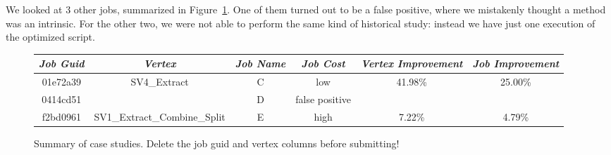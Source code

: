 We looked at 3 other jobs, summarized in Figure~\ref{fig:caseStudySummary}.
One of them turned out to be a false positive, where we mistakenly thought a method was an intrinsic.
For the other two, we were not able to perform the same kind of historical study: instead we have just one execution of the optimized script.
\begin{figure}[ht]
\begin{tabular}{c|c|c|c|c|c} 
{\em Job Guid} & {\em Vertex} & {\em Job Name} & {\em Job Cost} & {\em Vertex Improvement} & {\em Job Improvement} \\ \hline
01e72a39 & SV4\_Extract & C & low & 41.98\% & 25.00\% \\
0414cd51 & & D & false positive \\
f2bd0961 & SV1\_Extract\_Combine\_Split & E & high & 7.22\% & 4.79\%
\end{tabular}
\caption{Summary of case studies. {\sc Delete the job guid and vertex columns before submitting!}
\label{fig:caseStudySummary}}
\end{figure}

